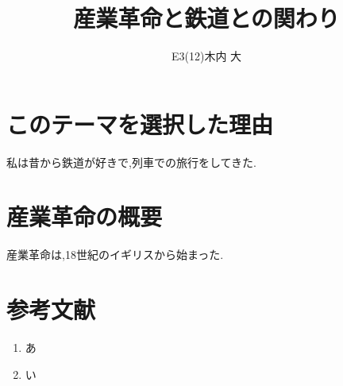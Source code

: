 \documentclass[fleqn,dvipdfmx,twocolumn]{jsarticle}
\title{産業革命と鉄道との関わり}
\author{
  E3(12)木内 大
}
\date{}
\begin{document}
\maketitle
\section{このテーマを選択した理由}
私は昔から鉄道が好きで,列車での旅行をしてきた.
\section{産業革命の概要}
産業革命は,18世紀のイギリスから始まった.
\section*{参考文献}
\begin{enumerate}
    \item あ
    \item い
\end{enumerate}
\end{document}

